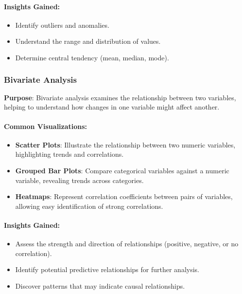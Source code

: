 \documentclass[
  letterpaper,
  DIV=11,
  numbers=noendperiod]{scrreprt}
\let\oldparagraph\paragraph
\renewcommand{\paragraph}[1]{\oldparagraph{#1}\mbox{}}
\providecommand{\tightlist}{%
  \setlength{\itemsep}{0pt}\setlength{\parskip}{0pt}}\usepackage{longtable,booktabs,array}
\begin{document}
\hypertarget{insights-gained}{%
\paragraph{Insights Gained:}\label{insights-gained}}

\begin{itemize}
\tightlist
\item
  Identify outliers and anomalies.
\item
  Understand the range and distribution of values.
\item
  Determine central tendency (mean, median, mode).
\end{itemize}

\hypertarget{bivariate-analysis}{%
\subsubsection{Bivariate Analysis}\label{bivariate-analysis}}

\textbf{Purpose}: Bivariate analysis examines the relationship between
two variables, helping to understand how changes in one variable might
affect another.

\hypertarget{common-visualizations-1}{%
\paragraph{Common Visualizations:}\label{common-visualizations-1}}

\begin{itemize}
\tightlist
\item
  \textbf{Scatter Plots}: Illustrate the relationship between two
  numeric variables, highlighting trends and correlations.
\item
  \textbf{Grouped Bar Plots}: Compare categorical variables against a
  numeric variable, revealing trends across categories.
\item
  \textbf{Heatmaps}: Represent correlation coefficients between pairs of
  variables, allowing easy identification of strong correlations.
\end{itemize}

\hypertarget{insights-gained-1}{%
\paragraph{Insights Gained:}\label{insights-gained-1}}

\begin{itemize}
\tightlist
\item
  Assess the strength and direction of relationships (positive,
  negative, or no correlation).
\item
  Identify potential predictive relationships for further analysis.
\item
  Discover patterns that may indicate causal relationships.
\end{itemize}
\end{document}
